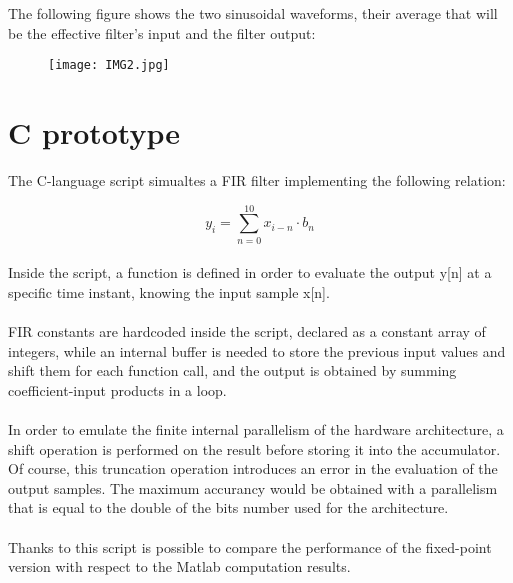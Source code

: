 The following figure shows the two sinusoidal waveforms, their average that will be the effective filter's input and the filter output:
\begin{figure}[!ht]
	\texttt{[image: IMG2.jpg]}
	\centering
\end{figure}


\section{C prototype}

The C-language script simualtes a FIR filter implementing the following  relation:

\begin{displaymath}
y_i = \sum_{n=0}^{10}{x_{i-n} \cdot b_n}
\end{displaymath}
\paragraph{}
Inside the script, a function is defined in order to evaluate the output y[n] at a specific time instant, knowing the input sample x[n].
\paragraph{}
FIR constants are hardcoded inside the script, declared as a constant array of integers, while an internal buffer is needed to store the previous input values and shift them for each function call, and the output is obtained by summing coefficient-input products in a loop.
\paragraph{}
In order to emulate the finite internal parallelism of the hardware architecture, a shift operation is performed on the result before storing it into the accumulator.
Of course, this truncation operation introduces an error in the evaluation of the output samples.
The maximum accurancy would be obtained with a parallelism that is equal to the double of the bits number used for the architecture.

\paragraph{}
Thanks to this script is possible to compare the performance of the fixed-point version with respect to 
the Matlab computation results.

